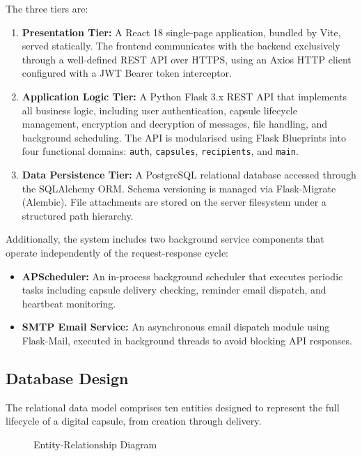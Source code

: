 \documentclass[12pt, a4paper]{article}
\begin{document}
The three tiers are:

\begin{enumerate}
  \item \textbf{Presentation Tier:} A React 18 single-page application, bundled by Vite, served statically. The frontend communicates with the backend exclusively through a well-defined REST API over HTTPS, using an Axios HTTP client configured with a JWT Bearer token interceptor.

  \item \textbf{Application Logic Tier:} A Python Flask 3.x REST API that implements all business logic, including user authentication, capsule lifecycle management, encryption and decryption of messages, file handling, and background scheduling. The API is modularised using Flask Blueprints into four functional domains: \texttt{auth}, \texttt{capsules}, \texttt{recipients}, and \texttt{main}.

  \item \textbf{Data Persistence Tier:} A PostgreSQL relational database accessed through the SQLAlchemy ORM. Schema versioning is managed via Flask-Migrate (Alembic). File attachments are stored on the server filesystem under a structured path hierarchy.
\end{enumerate}

Additionally, the system includes two background service components that operate independently of the request-response cycle:

\begin{itemize}
  \item \textbf{APScheduler:} An in-process background scheduler that executes periodic tasks including capsule delivery checking, reminder email dispatch, and heartbeat monitoring.
  \item \textbf{SMTP Email Service:} An asynchronous email dispatch module using Flask-Mail, executed in background threads to avoid blocking API responses.
\end{itemize}

\subsection{Database Design}

The relational data model comprises ten entities designed to represent the full lifecycle of a digital capsule, from creation through delivery.

\begin{figure}[H]
  \centering
  \caption{Entity-Relationship Diagram}
  \label{fig:erd}
\end{figure}
\end{document}
